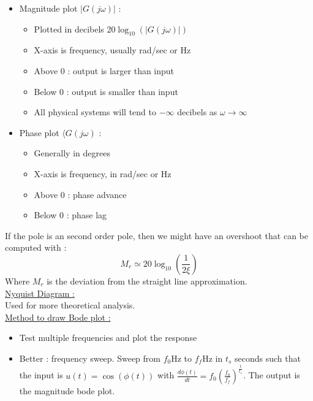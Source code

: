 \documentclass[../main.tex]{subfiles}
\begin{document}
\begin{itemize}
    \item Magnitude plot $\lvert G(j\omega)\rvert$ : \begin{itemize}
        \item Plotted in decibels $20\log_{10}(\lvert G(j\omega)\rvert)$\\
        \item X-axis is frequency, usually rad/sec or Hz\\
        \item Above 0 : output is larger than input\\
        \item Below 0 : output is smaller than input\\
        \item All physical systems will tend to $-\infty$ decibels as $\omega \rightarrow \infty$\\
    \end{itemize}
    \item Phase plot $\langle G(j\omega)$ : \begin{itemize}
        \item Generally in degrees\\
        \item X-axis is frequency, in rad/sec or Hz\\
        \item Above 0 : phase advance\\
        \item Below 0 : phase lag\\
    \end{itemize}
\end{itemize}

If the pole is an second order pole, then we might have an overshoot that can be computed with : \begin{equation}
    M_r \simeq 20\log_{10}(\frac{1}{2\xi})
\end{equation}
Where $M_r$ is the deviation from the straight line approximation.\\

\quad \underline{Nyquist Diagram :}\\
Used for more theoretical analysis.\\

\quad \underline{Method to draw Bode plot :}\\
\begin{itemize}
    \item Test multiple frequencies and plot the response\\
    \item Better : frequency sweep. Sweep from $f_0$Hz to $f_f$Hz in $t_s$ seconds such that the input is $u(t) = \cos(\phi(t))$ with $\frac{d\phi(t)}{dt} = f_0 (\frac{f_0}{f_f})^{\frac{t}{t_s}}$. The output is the magnitude bode plot.\\
\end{itemize}
\end{document}
